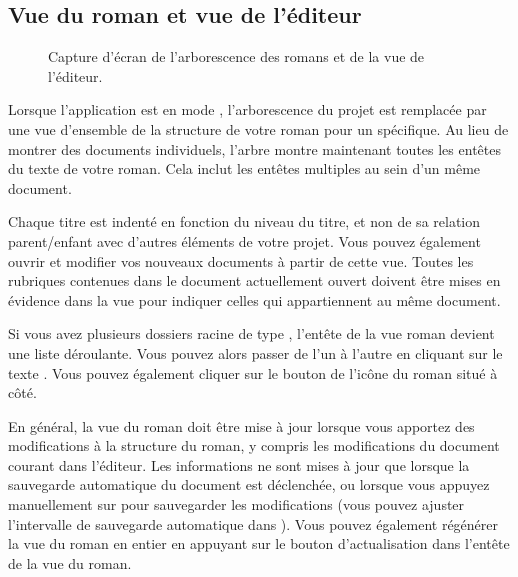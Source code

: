 \documentclass[a4paper,11pt,french]{sphinxmanual}
\begin{document}
\subsection{Vue du roman et vue de l’éditeur}
\label{\detokenize{usage_breakdown:novel-view-and-editor-view}}
\begin{figure}[htbp]
\centering
\capstart

\noindent{}
\caption{Capture d’écran de l’arborescence des romans et de la vue de l’éditeur.}\label{\detokenize{usage_breakdown:id2}}\end{figure}

\sphinxAtStartPar
Lorsque l’application est en mode , l’arborescence du projet est remplacée par une vue d’ensemble de la structure de votre roman pour un {\hyperref[\detokenize{int_glossary:term-Root-Folder}]{}} spécifique. Au lieu de montrer des documents individuels, l’arbre montre maintenant toutes les en\sphinxhyphen{}têtes du texte de votre roman. Cela inclut les entêtes multiples au sein d’un même document.

\sphinxAtStartPar
Chaque titre est indenté en fonction du niveau du titre, et non de sa relation parent/enfant avec d’autres éléments de votre projet. Vous pouvez également ouvrir et modifier vos nouveaux documents à partir de cette vue. Toutes les rubriques contenues dans le document actuellement ouvert doivent être mises en évidence dans la vue pour indiquer celles qui appartiennent au même document.

\sphinxAtStartPar
Si vous avez plusieurs dossiers racine de type , l’en\sphinxhyphen{}tête de la vue roman devient une liste déroulante. Vous pouvez alors passer de l’un à l’autre en cliquant sur le texte . Vous pouvez également cliquer sur le bouton de l’icône du roman situé à côté.

\sphinxAtStartPar
En général, la vue du roman doit être mise à jour lorsque vous apportez des modifications à la structure du roman, y compris les modifications du document courant dans l’éditeur. Les informations ne sont mises à jour que lorsque la sauvegarde automatique du document est déclenchée, ou lorsque vous appuyez manuellement sur  pour sauvegarder les modifications (vous pouvez ajuster l’intervalle de sauvegarde automatique dans ). Vous pouvez également régénérer la vue du roman en entier en appuyant sur le bouton d’actualisation dans l’en\sphinxhyphen{}tête de la vue du roman.
\end{document}
